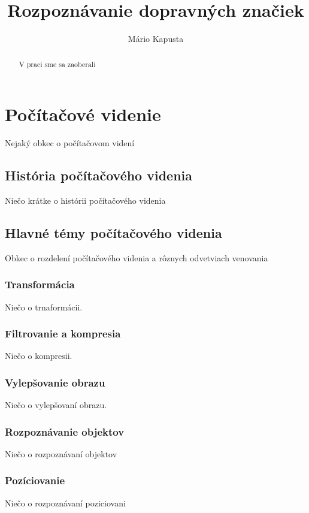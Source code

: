 \documentclass[12pt]{article}
\begin{document}
\title{Rozpoznávanie dopravných značiek}

\author{Mário Kapusta}
\maketitle
\thispagestyle{empty}
\clearpage
\tableofcontents
{}
\thispagestyle{empty}
\clearpage
\listoftables
\thispagestyle{empty}
\clearpage
\listoffigures
\thispagestyle{empty}
\clearpage
\begin{abstract}
V praci sme sa zaoberali
\end{abstract}
\clearpage

\section{Počítačové videnie}
Nejaký obkec o počítačovom videní
\subsection{História počítačového videnia}
Niečo krátke o histórii počítačového videnia
\subsection{Hlavné témy počítačového videnia}
Obkec o rozdelení počítačového videnia a rôznych odvetviach venovania
\subsubsection{Transformácia}
Niečo o trnaformácii.
\subsubsection{Filtrovanie a kompresia}
Niečo o kompresii.
\subsubsection{Vylepšovanie obrazu}
Niečo o vylepšovaní obrazu.
\subsubsection{Rozpoznávanie objektov}
Niečo o rozpoznávaní objektov
\subsubsection{Pozíciovanie}
Niečo o rozpoznávaní poziciovani
\end{document}
